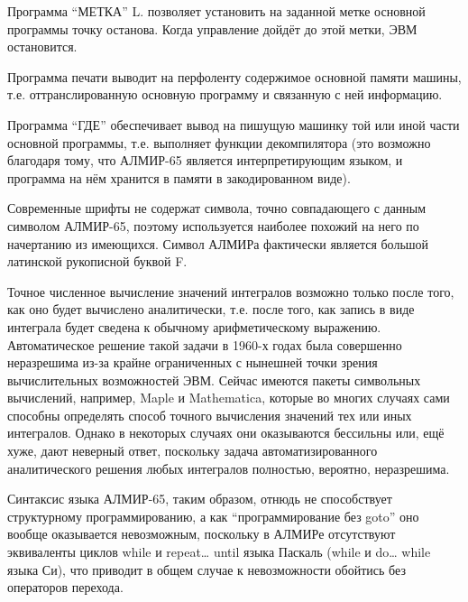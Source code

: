 \documentclass[11pt]{article}
\begin{document}
Программа “МЕТКА” L. позволяет
установить на заданной метке основной
программы точку останова. Когда
управление дойдёт до этой метки, ЭВМ
остановится.

Программа печати выводит на перфоленту
содержимое основной памяти машины, т.е.
оттранслированную основную программу
и связанную с ней информацию.

Программа “ГДЕ” обеспечивает вывод на
пишущую машинку той или иной части
основной программы, т.е. выполняет
функции декомпилятора (это возможно
благодаря тому, что АЛМИР-65 является
интерпретирующим языком, и программа
на нём хранится в памяти в
закодированном виде).

 Современные шрифты не содержат
символа, точно совпадающего с данным
символом АЛМИР-65, поэтому используется
наиболее похожий на него по начертанию
из имеющихся. Символ АЛМИРа фактически
является большой латинской рукописной
буквой F.

 Точное численное вычисление значений
интегралов возможно только после того,
как оно будет вычислено аналитически,
т.е. после того, как запись в виде
интеграла будет сведена к обычному
арифметическому выражению.
Автоматическое решение такой задачи в
1960-х годах была совершенно неразрешима
из-за крайне ограниченных с нынешней
точки зрения вычислительных
возможностей ЭВМ. Сейчас имеются
пакеты символьных вычислений,
например, Maple и Mathematica, которые во многих
случаях сами способны определять
способ точного вычисления значений тех
или иных интегралов. Однако в некоторых
случаях они оказываются бессильны или,
ещё хуже, дают неверный ответ,
поскольку задача автоматизированного
аналитического решения любых
интегралов полностью, вероятно,
неразрешима.

 Синтаксис языка АЛМИР-65, таким образом,
отнюдь не способствует структурному
программированию, а как
“программирование без goto” оно вообще
оказывается невозможным, поскольку в
АЛМИРе отсутствуют эквиваленты циклов
while и repeat… until языка Паскаль (while и do… while
языка Си), что приводит в общем случае к
невозможности обойтись без операторов
перехода.
\end{document}
